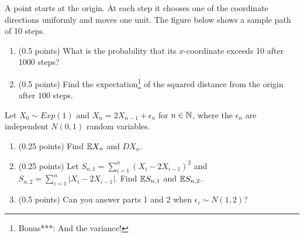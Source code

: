 \documentclass[a4paper]{report}
\begin{document}
\begin{problem} A point starts at the origin. At each step it chooses one
of the coordinate directions uniformly and moves one unit. The figure below shows a sample path of 10 steps.

\begin{center}


\end{center}

\begin{enumerate}
\item (0.5 points)
What is the probability that its $x$-coordinate exceeds 10 after 1000 steps?
\item (0.5 points) Find the expectation\footnote{Bonus***: And the variance!} of the squared distance from the origin after
$100$ steps.

 \end{enumerate}
\end{problem}



\begin{problem}
Let $X_0\sim Exp(1)$ and $X_n=2X_{n-1}+\epsilon_n$ for $n\in\mathbb N$, where the $\epsilon_n$ are independent $N(0,1)$ random variables.
\begin{enumerate}

\item (0.25 points) Find $\mathbb {E} X_n$ and $D X_n$.
\item (0.25 points) Let $S_{n,1}=\sum_{i=1}^n(X_i-2X_{i-1})^2$ and
$S_{n,2}=\sum_{i=1}^n|X_i-2X_{i-1}|$. Find $\mathbb {E} S_{n,1}$ and $\mathbb {E} S_{n,2}$.

\item (0.5 points) Can you answer parts 1 and 2 when $\epsilon_i\sim N(1,2)$?








 \end{enumerate}

\end{problem}
\end{document}
